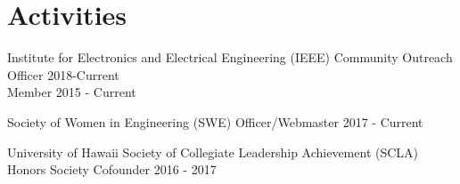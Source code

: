 \documentclass[]{wow}
\begin{document}
\begin{minipage}[t]{0.65\textwidth}


\section{Activities}
\vspace{\topsep} %
\small{}
\begin{tightemize}
\item Institute for Electronics and Electrical Engineering (IEEE) \newline      Community Outreach Officer 2018-Current \\
Member 2015 - Current
\item Society of Women in Engineering (SWE) Officer/Webmaster 2017 - Current \\ 
\item University of Hawaii Society of Collegiate Leadership Achievement (SCLA) Honors Society Cofounder 2016 - 2017
\end{tightemize}


\end{minipage} 
\end{document}
